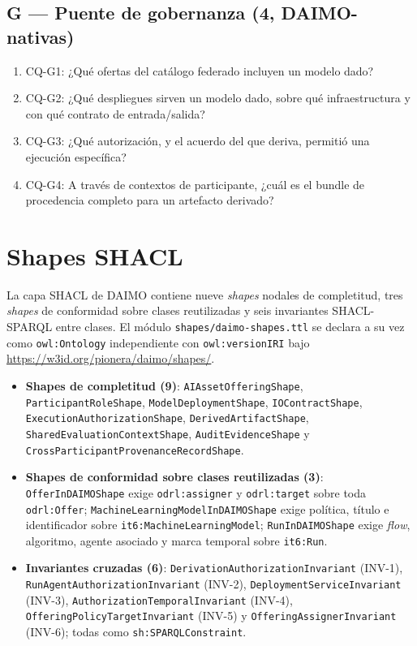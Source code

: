 \documentclass[Afour,sagev,times]{sagej}
\newcommand{\code}[1]{\texttt{#1}}
\newcommand{\cq}[1]{\textsf{#1}}
\begin{document}
\subsection*{G --- Puente de gobernanza (4, DAIMO-nativas)}
\begin{enumerate}[label=\arabic*., leftmargin=*]
\item \cq{CQ-G1}: ¿Qué ofertas del catálogo federado incluyen un modelo dado?
\item \cq{CQ-G2}: ¿Qué despliegues sirven un modelo dado, sobre qué infraestructura y con qué contrato de entrada/salida?
\item \cq{CQ-G3}: ¿Qué autorización, y el acuerdo del que deriva, permitió una ejecución específica?
\item \cq{CQ-G4}: A través de contextos de participante, ¿cuál es el bundle de procedencia completo para un artefacto derivado?
\end{enumerate}

\section{Shapes SHACL}\label{app:shapes}

La capa SHACL de DAIMO contiene nueve \emph{shapes} nodales de completitud, tres \emph{shapes} de conformidad sobre clases reutilizadas y seis invariantes SHACL-SPARQL entre clases. El módulo \code{shapes/daimo-shapes.ttl} se declara a su vez como \code{owl:Ontology} independiente con \code{owl:versionIRI} bajo \url{https://w3id.org/pionera/daimo/shapes/}.

\begin{itemize}[leftmargin=*]
\item \textbf{Shapes de completitud (9)}: \code{AIAssetOfferingShape}, \code{ParticipantRoleShape}, \code{ModelDeploymentShape}, \code{IOContractShape}, \code{ExecutionAuthorizationShape}, \code{DerivedArtifactShape}, \code{SharedEvaluationContextShape}, \code{AuditEvidenceShape} y \code{CrossParticipantProvenanceRecordShape}.
\item \textbf{Shapes de conformidad sobre clases reutilizadas (3)}: \code{OfferInDAIMOShape} exige \code{odrl:assigner} y \code{odrl:target} sobre toda \code{odrl:Offer}; \code{MachineLearningModelInDAIMOShape} exige política, título e identificador sobre \code{it6:MachineLearningModel}; \code{RunInDAIMOShape} exige \emph{flow}, algoritmo, agente asociado y marca temporal sobre \code{it6:Run}.
\item \textbf{Invariantes cruzadas (6)}: \code{DerivationAuthorizationInvariant} (INV-1), \code{RunAgentAuthorizationInvariant} (INV-2), \code{DeploymentServiceInvariant} (INV-3), \code{AuthorizationTemporalInvariant} (INV-4), \code{OfferingPolicyTargetInvariant} (INV-5) y \code{OfferingAssignerInvariant} (INV-6); todas como \code{sh:SPARQLConstraint}.
\end{itemize}
\end{document}

